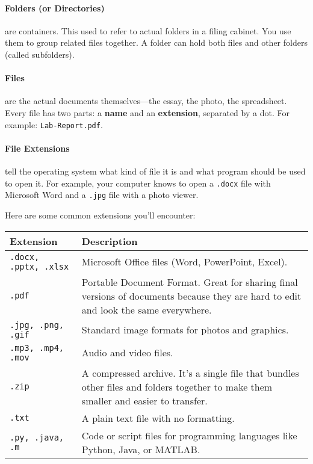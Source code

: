\documentclass[11pt,a4paper]{report}
\newcommand{\bfb}[1]{{\bf \color{blue} #1}}
\begin{document}
\paragraph{Folders (or Directories)} are containers. This used to refer to actual folders in a filing cabinet. You use them to group related files together. A folder can hold both files and other folders (called subfolders).

\paragraph{Files} are the actual documents themselves—the essay, the photo, the spreadsheet. Every file has two parts: a \textbf{name} and an \textbf{extension}, separated by a dot. For example: \texttt{Lab-Report.pdf}.

\paragraph{File Extensions} tell the operating system what kind of file it is and what program should be used to open it. For example, your computer knows to open a \texttt{.docx} file with Microsoft Word and a \texttt{.jpg} file with a photo viewer.

Here are some common extensions you'll encounter:
\begin{center}
\begin{tabular}{|l|p{}|}
\hline
\bfb{Extension} & \bfb{Description} \\
\hline
\texttt{.docx, .pptx, .xlsx} & Microsoft Office files (Word, PowerPoint, Excel). \\
\texttt{.pdf} & Portable Document Format. Great for sharing final versions of documents because they are hard to edit and look the same everywhere. \\
\texttt{.jpg, .png, .gif} & Standard image formats for photos and graphics. \\
\texttt{.mp3, .mp4, .mov} & Audio and video files. \\
\texttt{.zip} & A compressed archive. It's a single file that bundles other files and folders together to make them smaller and easier to transfer. \\
\texttt{.txt} & A plain text file with no formatting. \\
\texttt{.py, .java, .m} & Code or script files for programming languages like Python, Java, or MATLAB. \\
\hline
\end{tabular}
\end{center}
\end{document}
